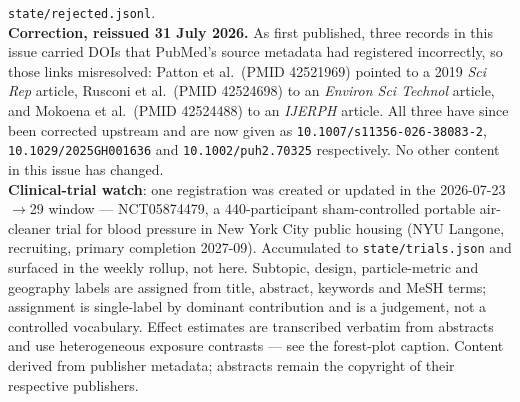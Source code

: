 \documentclass[10pt]{article}
\begin{document}
\begin{keybox}
{\texttt{state/rejected.jsonl}.
\\[1.0mm]
\textbf{Correction, reissued 31 July 2026.} As first published, three records in this
issue carried DOIs that PubMed's source metadata had registered incorrectly, so those
links misresolved: Patton et al.\ (PMID 42521969) pointed to a 2019 \textit{Sci Rep}
article, Rusconi et al.\ (PMID 42524698) to an \textit{Environ Sci Technol} article, and
Mokoena et al.\ (PMID 42524488) to an \textit{IJERPH} article. All three have since been
corrected upstream and are now given as
\texttt{10.1007/s11356-026-38083-2}, \texttt{10.1029/2025GH001636} and
\texttt{10.1002/puh2.70325} respectively. No other content in this issue has changed.
\\[1.0mm]
\textbf{Clinical-trial watch}: one registration was created or updated in the
2026-07-23$\rightarrow$29 window --- NCT05874479, a 440-participant sham-controlled
portable air-cleaner trial for blood pressure in New York City public housing
(NYU Langone, recruiting, primary completion 2027-09). Accumulated to
\texttt{state/trials.json} and surfaced in the weekly rollup, not here.
Subtopic, design, particle-metric and geography labels are assigned from title, abstract,
keywords and MeSH terms; assignment is single-label by dominant contribution and is a
judgement, not a controlled vocabulary. Effect estimates are transcribed verbatim from
abstracts and use heterogeneous exposure contrasts --- see the forest-plot caption.
Content derived from publisher metadata; abstracts remain the copyright of their
respective publishers.\par}
\end{keybox}
\end{document}
